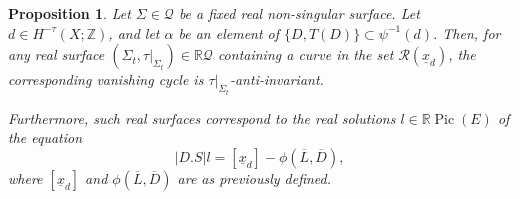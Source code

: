 \documentclass[11pt]{amsart}
\numberwithin{equation}{section}
\theoremstyle{definition}
\theoremstyle{plain}
\newtheorem{proposition}[definition]{Proposition}
\theoremstyle{remark}
\newcommand{\R}{\mathbb{R}}
\newcommand{\Z}{\mathbb{Z}}
\DeclareMathOperator{\Pic}{Pic}
\begin{document}
\begin{proposition} \label{prop-corresponding.surface.picE}
Let $\Sigma \in \mathcal{Q}$ be a fixed real non-singular surface.
Let $d\in H^{-\tau}(X;\Z)$, and let $\alpha$ be an element of 
$\{D,T (D)\}\subset \psi^{-1}(d)$. Then, for any real surface $(\Sigma_t, \tau|_{\Sigma_t}) \in \mathbb{R} \mathcal{Q}$ containing a curve in the set $\mathcal{R}(\underline{x}_d)$, the corresponding vanishing cycle is $\tau|_{\Sigma_t}$-anti-invariant.

Furthermore, such real surfaces correspond to the real solutions $l\in \R \Pic(E)$ of the equation
\begin{equation}\label{eq-solutions.in.PicE}
    |D.S|l=[\underline{x}_d]-\phi\left(\overline{L},\overline{D}\right),
\end{equation}
where $[\underline{x}_d]$ and $\phi(\overline{L}, \overline{D})$  are as previously defined.
\end{proposition}
\end{document}
